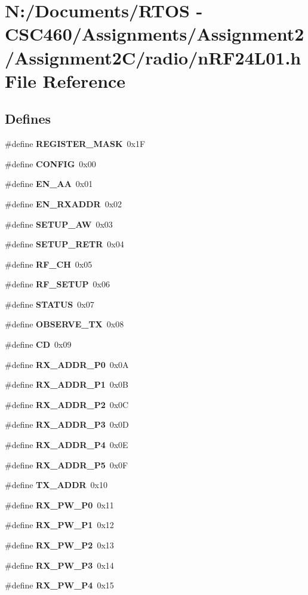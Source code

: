 \section{N:/Documents/RTOS - CSC460/Assignments/Assignment2/Assignment2C/radio/n\-RF24L01.h File Reference}
\label{n_r_f24_l01_8h}
\subsection*{Defines}
\begin{CompactItemize}
\item 
\#define {\bf REGISTER\_\-MASK}~0x1F
\item 
\#define {\bf CONFIG}~0x00
\item 
\#define {\bf EN\_\-AA}~0x01
\item 
\#define {\bf EN\_\-RXADDR}~0x02
\item 
\#define {\bf SETUP\_\-AW}~0x03
\item 
\#define {\bf SETUP\_\-RETR}~0x04
\item 
\#define {\bf RF\_\-CH}~0x05
\item 
\#define {\bf RF\_\-SETUP}~0x06
\item 
\#define {\bf STATUS}~0x07
\item 
\#define {\bf OBSERVE\_\-TX}~0x08
\item 
\#define {\bf CD}~0x09
\item 
\#define {\bf RX\_\-ADDR\_\-P0}~0x0A
\item 
\#define {\bf RX\_\-ADDR\_\-P1}~0x0B
\item 
\#define {\bf RX\_\-ADDR\_\-P2}~0x0C
\item 
\#define {\bf RX\_\-ADDR\_\-P3}~0x0D
\item 
\#define {\bf RX\_\-ADDR\_\-P4}~0x0E
\item 
\#define {\bf RX\_\-ADDR\_\-P5}~0x0F
\item 
\#define {\bf TX\_\-ADDR}~0x10
\item 
\#define {\bf RX\_\-PW\_\-P0}~0x11
\item 
\#define {\bf RX\_\-PW\_\-P1}~0x12
\item 
\#define {\bf RX\_\-PW\_\-P2}~0x13
\item 
\#define {\bf RX\_\-PW\_\-P3}~0x14
\item 
\#define {\bf RX\_\-PW\_\-P4}~0x15
\item 

\end{CompactItemize}
